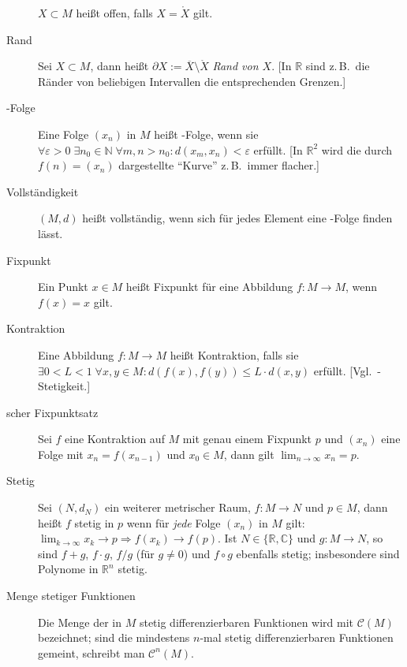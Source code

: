 \begin{description}
    $X \subset M$ heißt offen, falls $X = \mathring X$ gilt.
    \item[Rand] Sei $X \subset M$, dann heißt $\partial X := \overline X \setminus \mathring X$ \emph{Rand von $X$}.
    [In $\mathbb R$ sind z.\,B.~die Ränder von beliebigen Intervallen die entsprechenden Grenzen.]
    \item[\noun{Cauchy}-Folge] Eine Folge $(x_n)$ in $M$ heißt -Folge, wenn sie $\forall \varepsilon>0\; \exists n_0 \in \mathbb N\; \forall m,n > n_0 : d(x_m, x_n) < \varepsilon$ erfüllt.
    [In $\mathbb R^2$ wird die durch $f(n)=(x_n)$ dargestellte \enquote{Kurve} z.\,B.~immer flacher.]
    \item[Vollständigkeit] $(M,d)$ heißt vollständig, wenn sich für jedes Element eine -Folge finden lässt.
    \item[Fixpunkt] Ein Punkt $x \in M$ heißt Fixpunkt für eine Abbildung $f : M \to M$, wenn $f(x)=x$ gilt.
    \item[Kontraktion] Eine Abbildung $f : M \to M$ heißt Kontraktion, falls sie $\exists 0 < L < 1\; \forall x,y \in M : d(f(x), f(y)) \leq L \cdot d(x,y)$ erfüllt.
    [Vgl.~-Stetigkeit.]
    \item[\noun{Banach}scher Fixpunktsatz] Sei $f$ eine Kontraktion auf $M$ mit genau einem Fixpunkt $p$ und $(x_n)$ eine Folge mit $x_n = f(x_{n-1})$ und $x_0 \in M$, dann gilt $\lim_{n \to \infty} x_n = p$.
    \item[Stetig] Sei $(N,d_N)$ ein weiterer metrischer Raum, $f : M \to N$ und $p \in M$, dann heißt $f$ stetig in $p$ wenn für \emph{jede} Folge $(x_n)$ in $M$ gilt: $\lim_{k \to \infty} x_k \to p \Rightarrow f(x_k) \to f(p)$.
    Ist $N \in \{\mathbb R, \mathbb C\}$ und $g : M \to N$, so sind $f+g$, $f \cdot g$, $f/g$ (für $g \neq 0$) und $f \circ g$ ebenfalls stetig; insbesondere sind Polynome in $\mathbb R^n$ stetig.
    \item[Menge stetiger Funktionen] Die Menge der in $M$ stetig differenzierbaren Funktionen wird mit $\mathcal C(M)$ bezeichnet; sind die mindestens $n$-mal stetig differenzierbaren Funktionen gemeint, schreibt man $\mathcal C^n(M)$.
\end{description}



